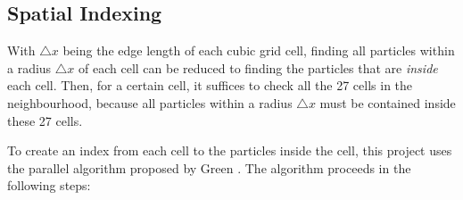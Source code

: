 \subsection{Spatial Indexing}
\label{subsection spatial indexing}
With $\triangle x$ being the edge length of each cubic grid cell, finding all particles within a radius $\triangle x$ of each cell can be reduced to finding the particles that are \textit{inside} each cell. Then, for a certain cell, it suffices to check all the 27 cells in the neighbourhood, because all particles within a radius $\triangle x$ must be contained inside these 27 cells. 


To create an index from each cell to the particles inside the cell, this project uses the parallel algorithm proposed by Green \cite{green2008cuda}. The algorithm proceeds in the following steps:

